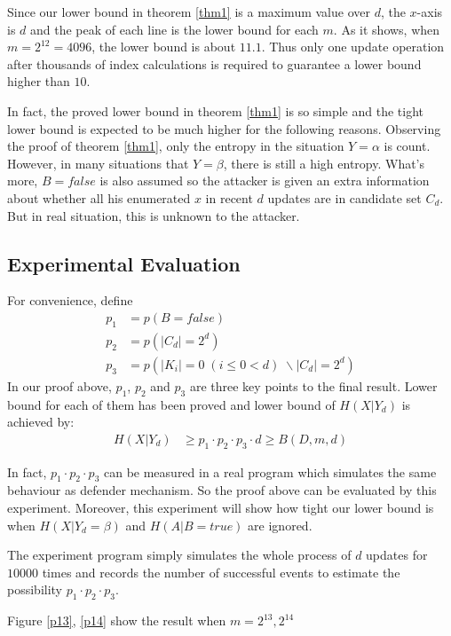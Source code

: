 \documentclass[10pt, conference, compsocconf]{IEEEtran}
\begin{document}
		Since our lower bound in theorem \ref{thm1} is a maximum value
		over $d$, the $x$-axis is $d$ and the peak of each line
		is the lower bound for each $m$. As it shows, when $m = 2^{12} = 4096$, the lower
		bound is about $11.1$. 
		Thus only one update operation after thousands of index calculations is required
		to guarantee a lower bound higher than $10$.
		
		In fact, the proved lower bound in theorem \ref{thm1} is so
		simple and the tight lower bound is expected to be much higher
		for the following reasons.
		Observing the proof of theorem \ref{thm1}, only the
		entropy in the situation $Y = \alpha$ is count. However, in
		many situations that $Y = \beta$, there is still a high entropy.
		What's more, $B = false$ is also assumed so the attacker is
		given an extra information about whether all his enumerated $x$
		in recent $d$ updates are in candidate set $C_d$. But
		in real situation, this is unknown to the attacker.
		
	\subsection{Experimental Evaluation}
		For convenience, define
		\begin{align*}
		 p_1 &= p(B = false)\\
		 p_2 &= p(|C_d| = 2^d)\\
		 p_3 &= p(|K_i| = 0 \; (i \leq 0 < d) \; \backslash |C_d| = 2^d)
		\end{align*}
		In our proof above, $p_1$,
		$p_2$ and $p_3$ are 
		three key points to the final result.
		Lower bound for each of them has been proved
		and lower bound of $H(X | Y_d)$ is achieved by:
		\begin{align*}
			H(X | Y_d) &\geq p_1 \cdot p_2 \cdot p_3 \cdot d
				\geq B(D, m, d)
		\end{align*}
		
		In fact, $p_1 \cdot p_2 \cdot p_3$ can be measured in a real program which 
		simulates the same behaviour as defender mechanism.
		So the proof above can be evaluated by this experiment.
		Moreover, this experiment will show how tight our lower bound is
		when $H(X | Y_d = \beta)$ and $H(A | B = true)$ are ignored.
		
		The experiment program simply simulates the whole process of $d$ updates
		for $10000$ times and records the number of successful events
		to estimate the possibility $p_1 \cdot p_2 \cdot p_3$.
		
		Figure \ref{p13}, \ref{p14} show the result when $m = 2^{13}, 2^{14}$
		
\end{document}
